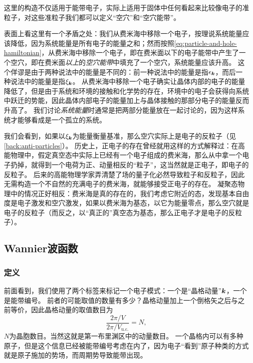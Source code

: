 这里的构造不仅适用于能带电子，实际上适用于固体中任何看起来比较像电子的准粒子，对这些准粒子我们都可以定义“空穴”和“空穴能带”。

表面上看这里有一个矛盾之处：我们从费米海中移除一个电子，按理说系统能量应该降低，因为系统能量是所有电子的能量之和；然而按照\eqref{eq:particle-and-hole-hamiltonian}，从费米海中移除一个电子，即在费米面以下的电子能带中产生了一个空穴，即在费米面\emph{以上}的\emph{空穴能带}中填充了一个空穴，系统能量应该升高。
这个佯谬是由于两种说法中的能量是不同的：前一种说法中的能量是指$\epsilon_{\vb*{k}}$，而后一种说法中的能量是指$\xi_{\vb*{k}}$。
从费米海中移除一个电子确实让晶体内部的电子的能量降低了，但是由于系统和环境的接触和化学势的存在，环境中的电子会获得向系统中跃迁的势能，因此晶体内部电子的能量加上与晶体接触的那部分电子的能量反而升高了。
我们讨论\emph{系统能量}时通常是把两部分能量放在一起讨论的，因为这样系统才能够看成是一个孤立的系统。

我们会看到，如果以$\xi_{\vb*{k}}$为能量衡量基准，那么空穴实际上是电子的反粒子（见\autoref{back:anti-particles}）。
历史上，正电子的存在曾经就用这样的方式解释过：在高能物理中，假定真空态中实际上已经有一个电子组成的费米海，那么从中拿一个电子扔掉，就得到一个电荷为正、动量相反的“粒子”，这当然就是正电子，即电子的反粒子。
后来的高能物理学家弄清楚了场的量子化必然导致粒子和反粒子，因此无需构造一个不自然的充满电子的费米海，就能够接受正电子的存在。
凝聚态物理中的情况正好相反：费米海是真的存在的，我们考虑它附近的态，发现基本自由度是电子激发和空穴激发，如果以费米海为基态，以它为能量零点，那么空穴就是电子的反粒子（而反之，以“真正的”真空态为基态，那么正电子才是电子的反粒子）。

\subsection{Wannier波函数}

\subsubsection{定义}

前面看到，我们使用了两个标签来标记一个电子模式：一个是“晶格动量”$\vb*{k}$，一个是能带编号。
前者的可能取值的数量有多少？晶格动量加上一个倒格矢之后与之前等价，因此晶格动量的取值数目为
\[
    \frac{2\pi / V}{2\pi / V_\text{u.c.}} = N,
\]
$N$为晶胞数目。当然这就是第一布里渊区中的动量数目。
一个晶格内可以有多种原子，但是这个信息已经被能带编号考虑在内了，因为电子“看到”原子种类的方式就是原子施加的势场，而周期势导致能带出现。

